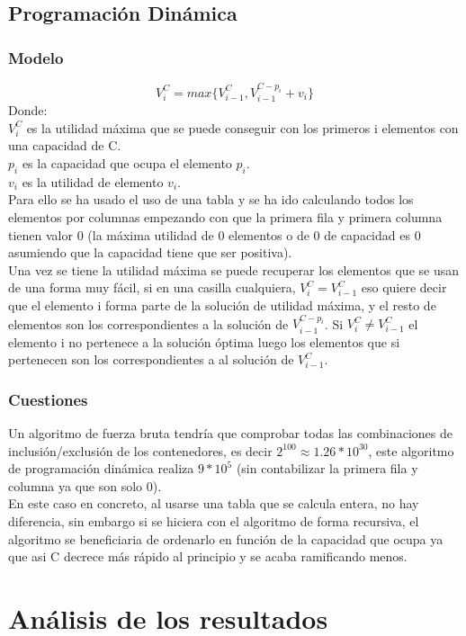 \documentclass[11pt,spanish]{article}
\begin{document}
		\subsection{Programación Dinámica}
			\subsubsection{Modelo}
			$$V_i^C = max\{V_{i-1}^C,V_{i-1}^{C-p_i}+v_i\} $$
			Donde:\\
			$V_i^C$ es la utilidad máxima que se puede conseguir con los primeros i elementos con una capacidad de C.\\
			$p_i$ es la capacidad que ocupa el elemento $p_i$.\\
			$v_i$ es la utilidad de elemento $v_i$.\\
			Para ello se ha usado el uso de una tabla y se ha ido calculando todos los elementos por columnas empezando con que la primera fila y primera columna tienen valor 0 (la máxima utilidad de 0 elementos o de 0 de capacidad es 0 asumiendo que la capacidad tiene que ser positiva).\\
			Una vez se tiene la utilidad máxima se puede recuperar los elementos que se usan de una forma muy fácil, si en una casilla cualquiera, $V_i^C=V_{i-1}^C$ eso quiere decir que el elemento i forma parte de la solución de utilidad máxima, y el resto de elementos son los correspondientes a la solución de $V_{i-1}^{C-p_i}$. Si $V_i^C \neq V_{i-1}^C$ el elemento i no pertenece a la solución óptima luego los elementos que si pertenecen son los correspondientes a al solución de $V_{i-1}^C$.
			\subsubsection{Cuestiones}
			Un algoritmo de fuerza bruta tendría que comprobar todas las combinaciones de inclusión/exclusión de los contenedores, es decir $2^{100} \approx 1.26*10^{30}$, este algoritmo de programación dinámica realiza $9*10^5$ (sin contabilizar la primera fila y columna ya que son solo 0).\\
			En este caso en concreto, al usarse una tabla que se calcula entera, no hay diferencia, sin embargo si se hiciera con el algoritmo de forma recursiva, el algoritmo se beneficiaria de ordenarlo en función de la capacidad que ocupa ya que asi C decrece más rápido al principio y se acaba ramificando menos.
	\section{Análisis de los resultados}
\end{document}
